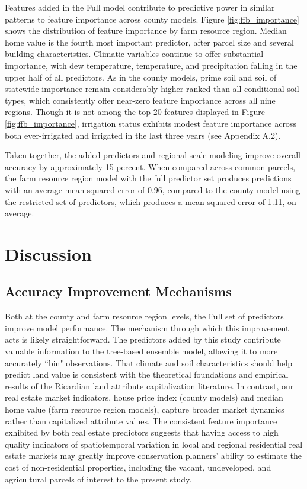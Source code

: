 \documentclass[12pt]{article}
\begin{document}
Features added in the Full model contribute to predictive power in similar patterns to feature importance across county models. Figure \ref{fig:ffb_importance} shows the distribution of feature importance by farm resource region. Median home value is the fourth most important predictor, after parcel size and several building characteristics. Climatic variables continue to offer substantial importance, with dew temperature, temperature, and precipitation falling in the upper half of all predictors. As in the county models, prime soil and soil of statewide importance remain considerably higher ranked than all conditional soil types, which consistently offer near-zero feature importance across all nine regions. Though it is not among the top 20 features displayed in Figure \ref{fig:ffb_importance}, irrigation status exhibits modest feature importance across both ever-irrigated and irrigated in the last three years (see Appendix A.2).

Taken together, the added predictors and regional scale modeling improve overall accuracy by approximately 15 percent. When compared across common parcels, the farm resource region model with the full predictor set produces predictions with an average mean squared error of 0.96, compared to the county model using the restricted set of predictors, which produces a mean squared error of 1.11, on average.

\section{Discussion}

\subsection{Accuracy Improvement Mechanisms}

Both at the county and farm resource region levels, the Full set of predictors improve model performance. The mechanism through which this improvement acts is likely straightforward. The predictors added by this study contribute valuable information to the tree-based ensemble model, allowing it to more accurately ``bin" observations. That climate and soil characteristics should help predict land value is consistent with the theoretical foundations and empirical results of the Ricardian land attribute capitalization literature. In contrast, our real estate market indicators, house price index (county models) and median home value (farm resource region models), capture broader market dynamics rather than capitalized attribute values. The consistent feature importance exhibited by both real estate predictors suggests that having access to high quality indicators of spatiotemporal variation in local and regional residential real estate markets may greatly improve conservation planners' ability to estimate the cost of non-residential properties, including the vacant, undeveloped, and agricultural parcels of interest to the present study.
\end{document}
